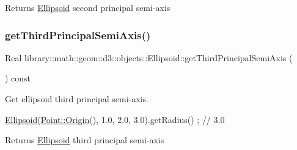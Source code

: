 \begin{DoxyReturn}{Returns}
\hyperlink{classlibrary_1_1math_1_1geom_1_1d3_1_1objects_1_1_ellipsoid}{Ellipsoid} second principal semi-\/axis 
\end{DoxyReturn}
\mbox{\label{classlibrary_1_1math_1_1geom_1_1d3_1_1objects_1_1_ellipsoid_a62b97423985083db726d34eced6b58ae}} 
\subsubsection{\texorpdfstring{get\+Third\+Principal\+Semi\+Axis()}{getThirdPrincipalSemiAxis()}}
{\footnotesize\ttfamily Real library\+::math\+::geom\+::d3\+::objects\+::\+Ellipsoid\+::get\+Third\+Principal\+Semi\+Axis (\begin{DoxyParamCaption}{ }\end{DoxyParamCaption}) const}



Get ellipsoid third principal semi-\/axis. 


\begin{DoxyCode}
\hyperlink{classlibrary_1_1math_1_1geom_1_1d3_1_1objects_1_1_ellipsoid_aae81fe0edc7f0e8d4590ea89ae73cb14}{Ellipsoid}(\hyperlink{classlibrary_1_1math_1_1geom_1_1d3_1_1objects_1_1_point_ab2a38e285c562e50bf350272c083986f}{Point::Origin}(), 1.0, 2.0, 3.0).getRadius() ; \textcolor{comment}{// 3.0}
\end{DoxyCode}


\begin{DoxyReturn}{Returns}
\hyperlink{classlibrary_1_1math_1_1geom_1_1d3_1_1objects_1_1_ellipsoid}{Ellipsoid} third principal semi-\/axis 
\end{DoxyReturn}
\mbox{\label{classlibrary_1_1math_1_1geom_1_1d3_1_1objects_1_1_ellipsoid_adb42c2c7734c27dcb16d947fc5c9d76d}} 
